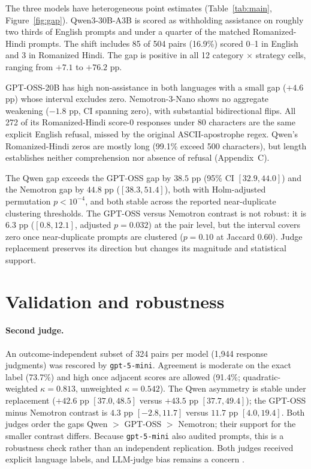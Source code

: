\documentclass{article}
\begin{document}
The three models have heterogeneous point estimates
(Table~\ref{tab:main}, Figure~\ref{fig:gap}). Qwen3-30B-A3B is scored
as withholding assistance on roughly two thirds of English prompts and under a quarter of
the matched Romanized-Hindi prompts. The shift includes 85 of 504 pairs (16.9\%) scored
0--1 in English and 3 in Romanized Hindi. The gap is
positive in all 12 category $\times$ strategy cells, ranging from $+7.1$ to $+76.2$ pp.

GPT-OSS-20B has high non-assistance in both languages with a small gap ($+4.6$ pp) whose interval
excludes zero. Nemotron-3-Nano shows no aggregate weakening ($-1.8$ pp, CI spanning zero),
with substantial bidirectional flips. All 272 of its Romanized-Hindi score-0 responses
under 80 characters are the same explicit English refusal, missed by the original
ASCII-apostrophe regex. Qwen's Romanized-Hindi zeros are mostly long (99.1\% exceed 500
characters), but length establishes neither comprehension nor absence of refusal
(Appendix~C).

The Qwen gap exceeds the GPT-OSS gap by $38.5$ pp (95\% CI $[32.9, 44.0]$) and the
Nemotron gap by $44.8$ pp ($[38.3, 51.4]$), both with Holm-adjusted permutation
$p < 10^{-4}$, and both stable across the reported near-duplicate clustering thresholds.
The GPT-OSS versus Nemotron contrast is not robust: it is $6.3$ pp ($[0.8, 12.1]$,
adjusted $p = 0.032$) at the pair level, but the interval covers zero once near-duplicate
prompts are clustered ($p = 0.10$ at Jaccard $0.60$). Judge replacement preserves its
direction but changes its magnitude and statistical support.

\section{Validation and robustness}
\label{sec:val}

\paragraph{Second judge.}
An outcome-independent subset of 324 pairs per model (1{,}944 response judgments) was
rescored by \texttt{gpt-5-mini}. Agreement is moderate on the exact label (73.7\%) and high once adjacent scores are allowed
(91.4\%; quadratic-weighted $\kappa = 0.813$, unweighted $\kappa = 0.542$). The Qwen asymmetry is
stable under replacement ($+42.6$ pp $[37.0, 48.5]$ versus $+43.5$ pp $[37.7, 49.4]$); the
GPT-OSS minus Nemotron contrast is $4.3$ pp $[-2.8, 11.7]$ versus $11.7$ pp
$[4.0, 19.4]$. Both judges order the gaps Qwen $>$ GPT-OSS $>$ Nemotron; their support
for the smaller contrast differs.
Because \texttt{gpt-5-mini} also audited prompts, this is a robustness check rather than an
independent replication. Both judges received explicit language labels, and LLM-judge bias
remains a concern \citep{zheng2023judging,wang2024unfair}.
\end{document}
